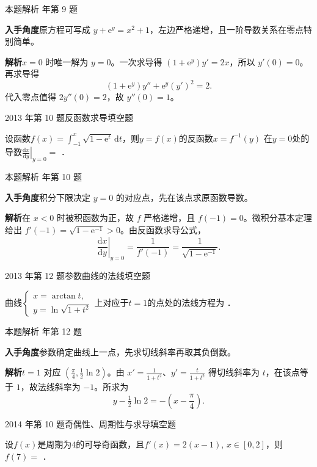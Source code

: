 \documentclass[UTF8,zihao=-4,fontset=fandol]{ctexart}
\newcommand{\blank}{\underline{\hspace{5em}}}
\newcommand{\QuestionPage}[6]{%
  \par\noindent\begin{minipage}{\linewidth}
  \raggedright
  {\small\textcolor{black!60}{#3\quad #5}\hfill\textcolor{accent}{#2}}\par\smallskip}
\newcommand{\QuestionEnd}{\end{minipage}\par\medskip}
\newcommand{\QuestionPage}[6]{%
  \clearpage
  {\small\textcolor{accent}{#1\hfill #2}}\par\medskip
  {\small\textcolor{black!60}{#3\quad #5\hfill #6}}\par\vspace{9bp}}
\newcommand{\QuestionEnd}{}
\newenvironment{QuestionSolution}[1]{%
  \clearpage
  {\small\textcolor{black!60}{本题解析\quad #1}}\par\medskip
}{\par\clearpage}
\begin{document}
\begin{QuestionSolution}{2012 年第 9 题}
\textbf{入手角度}\quad 原方程可写成 \(y+\mathrm{e}^y=x^2+1\)，左边严格递增，且一阶导数关系在零点特别简单。

\textbf{解析}\quad \(x=0\) 时唯一解为 \(y=0\)。一次求导得 \((1+\mathrm{e}^y)y'=2x\)，所以 \(y'(0)=0\)。再求导得
\[
(1+\mathrm{e}^y)y''+\mathrm{e}^y(y')^2=2.
\]
代入零点值得 \(2y''(0)=2\)，故 \(\boxed{y''(0)=1}\)。
\end{QuestionSolution}

\QuestionPage{2.2 求导的基本法则}{填空题}{2013 年第 10 题}{2}{反函数求导}{066 / 234}
设函数$f(x) = \int_{-1}^x \sqrt{1 - \mathrm{e}^t} \,\mathrm{d} t$，则$y = f(x)$的反函数$x = f^{-1}(y)$
在$y = 0$处的导数$\left. \frac{\mathrm{d} x}{\mathrm{d} y} \right|_{y = 0} =$ \blank{}．
\QuestionEnd

\begin{QuestionSolution}{2013 年第 10 题}
\textbf{入手角度}\quad 积分下限决定 \(y=0\) 的对应点，先在该点求原函数导数。

\textbf{解析}\quad 在 \(x<0\) 时被积函数为正，故 \(f\) 严格递增，且 \(f(-1)=0\)。微积分基本定理给出 \(f'(-1)=\sqrt{1-\mathrm{e}^{-1}}>0\)。由反函数求导公式，
\[
\left.\frac{\mathrm{d}x}{\mathrm{d}y}\right|_{y=0}
=\frac{1}{f'(-1)}=\boxed{\frac1{\sqrt{1-\mathrm{e}^{-1}}}}.
\]
\end{QuestionSolution}

\QuestionPage{2.2 求导的基本法则}{填空题}{2013 年第 12 题}{2}{参数曲线的法线}{067 / 234}
曲线$\begin{cases}
  x = \arctan t, \\
  y = \ln \sqrt{1 + t^2}
\end{cases}$上对应于$t = 1$的点处的法线方程为 \blank{}．
\QuestionEnd

\begin{QuestionSolution}{2013 年第 12 题}
\textbf{入手角度}\quad 参数确定曲线上一点，先求切线斜率再取其负倒数。

\textbf{解析}\quad \(t=1\) 对应 \((\frac{\pi}{4},\tfrac12\ln2)\)。由 \(x'=\frac{1}{1+t^2}\)、\(y'=\frac{t}{1+t^2}\) 得切线斜率为 \(t\)，在该点等于 \(1\)，故法线斜率为 \(-1\)。所求为
\[
\boxed{y-\tfrac12\ln2=-(x-\frac{\pi}{4})}.
\]
\end{QuestionSolution}

\QuestionPage{2.2 求导的基本法则}{填空题}{2014 年第 10 题}{2}{奇偶性、周期性与求导}{068 / 234}
设$f(x)$是周期为$4$的可导奇函数，且$f'(x)= 2(x - 1)$, $x \in[0,2]$，则$f(7) =$ \blank{}．
\QuestionEnd
\end{document}
